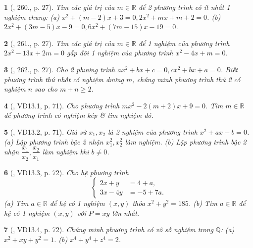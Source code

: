 \documentclass{article}
\newtheorem{baitoan}{}
\begin{document}
\begin{baitoan}[\cite{Binh_Toan_9_tap_2}, 260., p. 27]
	Tìm các giá trị của $m\in\mathbb{R}$ để 2 phương trình có ít nhất 1 nghiệm chung: (a) $x^2 + (m - 2)x + 3 = 0,2x^2 + mx + m + 2 = 0$. (b) $2x^2 + (3m - 5)x - 9 = 0,6x^2 + (7m - 15)x - 19 = 0$.
\end{baitoan}

\begin{baitoan}[\cite{Binh_Toan_9_tap_2}, 261., p. 27]
	Tìm các giá trị của $m\in\mathbb{R}$ để 1 nghiệm của phương trình $2x^2 - 13x + 2m = 0$ gấp đôi 1 nghiệm của phương trình $x^2 - 4x + m = 0$.
\end{baitoan}

\begin{baitoan}[\cite{Binh_Toan_9_tap_2}, 262., p. 27]
	Cho 2 phương trình $ax^2 + bx + c = 0,cx^2 + bx + a = 0$. Biết phương trình thứ nhất có nghiệm dương $m$, chứng minh phương trình thứ 2 có nghiệm $n$ sao cho $m + n\ge2$.
\end{baitoan}

\begin{baitoan}[\cite{TLCT_THCS_Toan_9_dai_so}, VD13.1, p. 71]
	Cho phương trình $mx^2 - 2(m + 2)x + 9 = 0$. Tìm $m\in\mathbb{R}$ để phương trình có nghiệm kép \& tìm nghiệm đó.
\end{baitoan}

\begin{baitoan}[\cite{TLCT_THCS_Toan_9_dai_so}, VD13.2, p. 71]
	Giả sử $x_1,x_2$ là 2 nghiệm của phương trình $x^2 + ax + b = 0$. (a) Lập phương trình bậc 2 nhận $x_1^2,x_2^2$ làm nghiệm. (b) Lập phương trình bậc 2 nhận $\dfrac{x_1}{x_2},\dfrac{x_2}{x_1}$ làm nghiệm khi $b\ne0$.
\end{baitoan}

\begin{baitoan}[\cite{TLCT_THCS_Toan_9_dai_so}, VD13.3, p. 72]
	Cho hệ phương trình
	\begin{equation*}
		\left\{\begin{split}
			2x + y &= 4 + a,\\
			3x - 4y &= -5 + 7a.
		\end{split}\right.
	\end{equation*}
	(a) Tìm $a\in\mathbb{R}$ để hệ có 1 nghiệm $(x,y)$ thỏa $x^2 + y^2 = 185$. (b) Tìm $a\in\mathbb{R}$ để hệ có 1 nghiệm $(x,y)$ với $P = xy$ lớn nhất.
\end{baitoan}

\begin{baitoan}[\cite{TLCT_THCS_Toan_9_dai_so}, VD13.4, p. 72]
	Chứng minh phương trình có vô số nghiệm trong $\mathbb{Q}$: (a) $x^2 + xy + y^2 = 1$. (b) $x^4 + y^4 + z^4 = 2$.
\end{baitoan}
\end{document}
